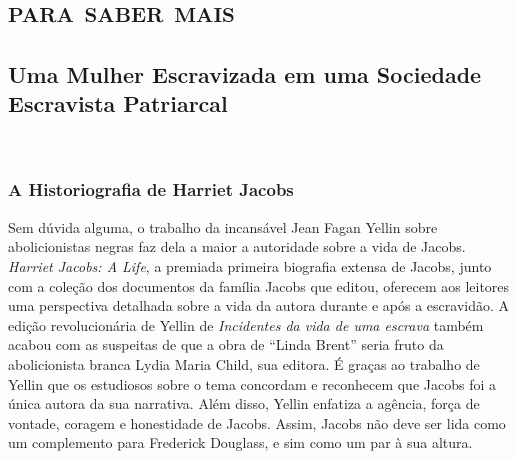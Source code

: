\part{\textsc{para saber mais}}

\chapter*{Uma Mulher Escravizada em uma Sociedade Escravista Patriarcal} %

\begin{flushright}
\\\vspace{-3pt}
\end{flushright}




\section{A Historiografia de Harriet Jacobs}

Sem dúvida alguma, o trabalho da incansável Jean Fagan Yellin sobre
abolicionistas negras faz dela a maior a autoridade sobre a vida de
Jacobs. \emph{Harriet Jacobs: A Life}, a premiada primeira biografia
extensa de Jacobs, junto com a coleção dos documentos da família Jacobs
que editou, oferecem aos leitores uma perspectiva detalhada sobre a vida
da autora durante e após a escravidão. A edição revolucionária de Yellin
de \emph{Incidentes da vida de uma escrava} também acabou com as
suspeitas de que a obra de ``Linda Brent'' seria fruto da abolicionista
branca Lydia Maria Child, sua editora. É graças ao trabalho de Yellin
que os estudiosos sobre o tema concordam e reconhecem que Jacobs foi a
única autora da sua narrativa. Além disso, Yellin enfatiza a agência,
força de vontade, coragem e honestidade de Jacobs. Assim, Jacobs não
deve ser lida como um complemento para Frederick Douglass, e sim como um
par à sua altura.

